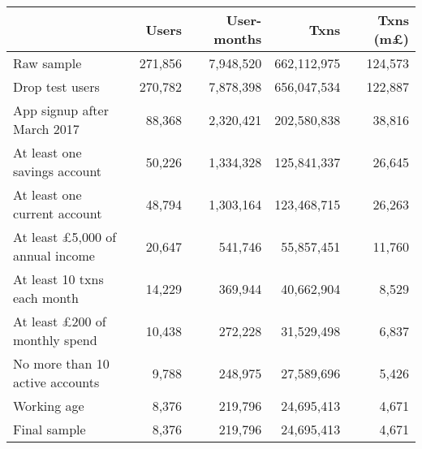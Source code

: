 \begin{tabular}{lrrrr}
\toprule
                                       &   Users & User-months &        Txns & Txns (m\pounds) \\
\midrule
                            Raw sample & 271,856 &   7,948,520 & 662,112,975 &         124,573 \\
                       Drop test users & 270,782 &   7,878,398 & 656,047,534 &         122,887 \\
           App signup after March 2017 &  88,368 &   2,320,421 & 202,580,838 &          38,816 \\
          At least one savings account &  50,226 &   1,334,328 & 125,841,337 &          26,645 \\
          At least one current account &  48,794 &   1,303,164 & 123,468,715 &          26,263 \\
At least \pounds5,000 of annual income &  20,647 &     541,746 &  55,857,451 &          11,760 \\
           At least 10 txns each month &  14,229 &     369,944 &  40,662,904 &           8,529 \\
  At least \pounds200 of monthly spend &  10,438 &     272,228 &  31,529,498 &           6,837 \\
       No more than 10 active accounts &   9,788 &     248,975 &  27,589,696 &           5,426 \\
                           Working age &   8,376 &     219,796 &  24,695,413 &           4,671 \\
                          Final sample &   8,376 &     219,796 &  24,695,413 &           4,671 \\
\bottomrule
\end{tabular}
